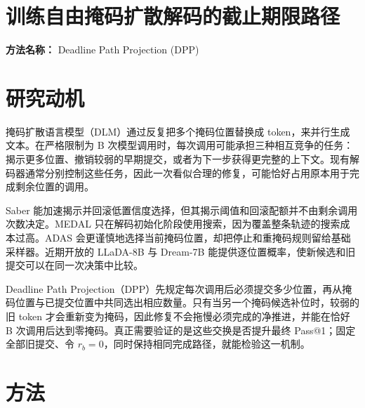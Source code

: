 \documentclass[10pt,a4paper]{article}
\begin{document}
\section*{训练自由掩码扩散解码的截止期限路径}
\textbf{方法名称：} Deadline Path Projection (DPP)
\section*{研究动机}
掩码扩散语言模型（DLM）通过反复把多个掩码位置替换成 token，来并行生成文本。在严格限制为 B 次模型调用时，每次调用可能承担三种相互竞争的任务：揭示更多位置、撤销较弱的早期提交，或者为下一步获得更完整的上下文。现有解码器通常分别控制这些任务，因此一次看似合理的修复，可能恰好占用原本用于完成剩余位置的调用。

Saber 能加速揭示并回滚低置信度选择，但其揭示阈值和回滚配额并不由剩余调用次数决定。MEDAL 只在解码初始化阶段使用搜索，因为覆盖整条轨迹的搜索成本过高。ADAS 会更谨慎地选择当前掩码位置，却把停止和重掩码规则留给基础采样器。近期开放的 LLaDA-8B 与 Dream-7B 能提供逐位置概率，使新候选和旧提交可以在同一次决策中比较。

Deadline Path Projection（DPP）先规定每次调用后必须提交多少位置，再从掩码位置与已提交位置中共同选出相应数量。只有当另一个掩码候选补位时，较弱的旧 token 才会重新变为掩码，因此修复不会拖慢必须完成的净推进，并能在恰好 B 次调用后达到零掩码。真正需要验证的是这些交换是否提升最终 Pass@1；固定全部旧提交、令 \(r_{b}=0\)，同时保持相同完成路径，就能检验这一机制。
\section*{方法}
\end{document}
